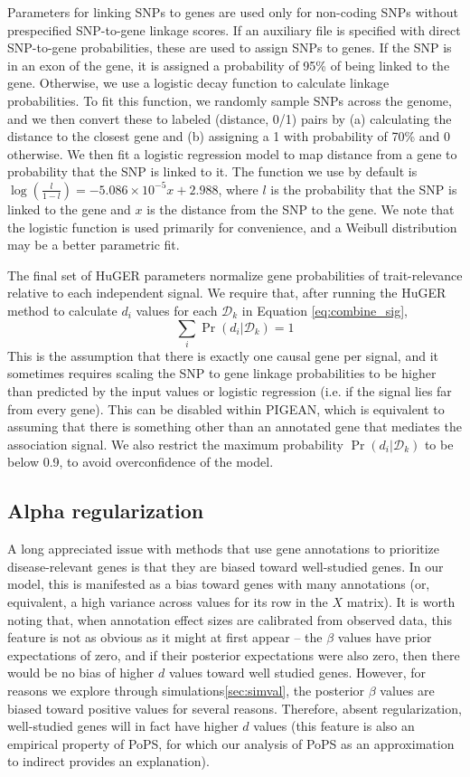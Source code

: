 {Parameters for linking SNPs to genes are used only for non-coding SNPs
without prespecified SNP-to-gene linkage scores\cite{}. If an
auxiliary file is specified with direct SNP-to-gene probabilities,
these are used to assign SNPs to genes. If the SNP is in an exon of
the gene, it is assigned a probability of 95\% of being linked to the
gene. Otherwise, we use a logistic decay function to calculate linkage
probabilities. To fit this function, we randomly sample SNPs across
the genome, and we then convert these to labeled (distance, 0/1) pairs
by (a) calculating the distance to the closest gene and (b) assigning
a 1 with probability of 70\% and 0 otherwise. We then fit a logistic
regression model to map distance from a gene to probability that the
SNP is linked to it. The function we use by default is
$\log\left(\frac{l}{1-l}\right) = -5.086\times
10^{-5}x + 2.988$, where $l$ is the probability that the SNP is linked
to the gene and $x$ is the distance from the SNP to the gene. We note
that the logistic function is used primarily for convenience, and a
Weibull distribution may be a better parametric fit\cite{}.

The final set of HuGER parameters normalize gene probabilities of
trait-relevance relative to each independent signal. We require that,
after running the HuGER method to calculate $d_i$ values for each
$\mathcal{D}_k$ in Equation \eqref{eq:combine_sig},
\[\sum_i\Pr\left(d_i|\mathcal{D}_k\right) = 1\]
This is the assumption that there is exactly one causal gene per
signal, and it sometimes requires scaling the SNP to gene linkage
probabilities to be higher than predicted by the input values or
logistic regression (i.e. if the signal lies far from every
gene). This can be disabled within PIGEAN, which is equivalent to
assuming that there is something other than an annotated gene that
mediates the association signal. We also restrict the maximum
probability $\Pr\left(d_i|\mathcal{D}_k\right)$ to be below 0.9, to
avoid overconfidence of the model.

\subsection{Alpha regularization}

A long appreciated issue with methods that use gene annotations to
prioritize disease-relevant genes is that they are biased toward
well-studied genes. In our model, this is manifested as a bias toward
genes with many annotations (or, equivalent, a high variance across
values for its row in the
$X$ matrix). It is worth noting that, when annotation effect sizes are
calibrated from observed data, this feature is not as obvious as it
might at first appear -- the $\beta$ values have prior expectations of
zero, and if their posterior expectations were also zero, then there
would be no bias of higher $d$ values toward well studied
genes. However, for reasons we explore through
simulations\ref{sec:simval}, the posterior $\beta$ values are biased
toward positive values for several reasons. Therefore, absent
regularization, well-studied genes will in fact have higher $d$ values
(this feature is also an empirical property of PoPS, for which our
analysis of PoPS as an approximation to indirect provides an
explanation).

}
